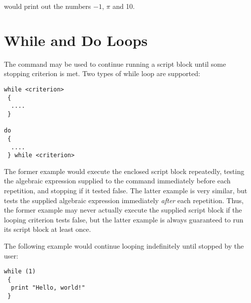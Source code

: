 \noindent would print out the numbers $-1$, $\pi$ and 10.

\section{While and Do Loops}

The  command may be used to continue running a script block
until some stopping criterion is met. Two types of while loop are supported:

\begin{verbatim}
while <criterion>
 {
  ....
 }

do
 {
  ....
 } while <criterion>
\end{verbatim}

The former example would execute the enclosed script block repeatedly, testing
the algebraic expression supplied to the  command immediately
before each repetition, and stopping if it tested false. The latter example is
very similar, but tests the supplied algebraic expression immediately {\it
after} each repetition. Thus, the former example may never actually execute the
supplied script block if the looping criterion tests false, but the latter
example is always guaranteed to run its script block at least once.

The following example would continue looping indefinitely until stopped by the
user:

\begin{verbatim}
while (1)
 {
  print "Hello, world!"
 }
\end{verbatim}

